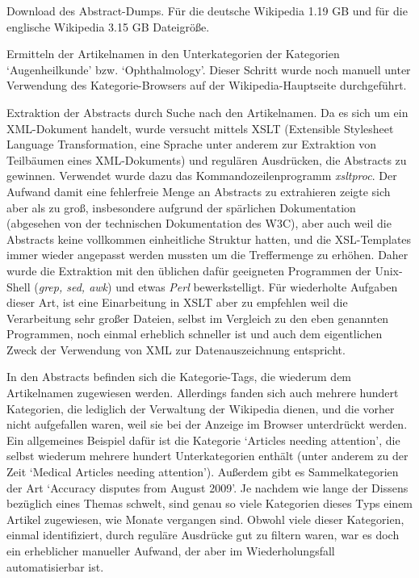 \documentclass[pagesize,DIV=calc,12pt,draft]{scrreprt}
\begin{document}
\begin{inparaenum}
\item Download des Abstract-Dumps. Für die deutsche Wikipedia 1.19 GB und für die englische Wikipedia 3.15 GB Dateigröße.

\item Ermitteln der Artikelnamen in den Unterkategorien der Kategorien   `Augenheilkunde' bzw. `Ophthalmology'. 
Dieser Schritt wurde noch   manuell unter Verwendung des Kategorie-Browsers auf der   Wikipedia-Hauptseite durchgeführt. 

\item Extraktion der Abstracts durch Suche nach den Artikelnamen. 
Da es sich um ein XML-Dokument handelt, wurde versucht mittels XSLT (Extensible   Stylesheet Language Transformation, eine Sprache unter anderem zur Extraktion von Teilbäumen eines XML-Dokuments) und regulären Ausdrücken, die   Abstracts zu gewinnen. 
Verwendet wurde dazu das Kommandozeilenprogramm   \emph{xsltproc}. 
Der Aufwand damit eine fehlerfreie Menge an Abstracts zu   extrahieren zeigte sich aber als zu groß, insbesondere aufgrund der   spärlichen Dokumentation (abgesehen von der technischen Dokumentation   des W3C), aber auch weil die Abstracts keine vollkommen einheitliche   Struktur hatten, und die XSL-Templates immer wieder angepasst werden   mussten um die Treffermenge zu erhöhen. 
Daher wurde die Extraktion mit   den üblichen dafür geeigneten Programmen der Unix-Shell (\emph{grep, sed,   awk}) und etwas \emph{Perl} bewerkstelligt. 
Für wiederholte Aufgaben dieser   Art, ist eine Einarbeitung in XSLT aber zu empfehlen weil die   Verarbeitung sehr großer Dateien, selbst im Vergleich zu den eben   genannten Programmen, noch einmal erheblich schneller ist und auch dem   eigentlichen Zweck der Verwendung von XML zur Datenauszeichnung   entspricht. 

\item In den Abstracts befinden sich die Kategorie-Tags, die wiederum dem   Artikelnamen zugewiesen werden. 
Allerdings fanden sich auch mehrere   hundert Kategorien, die lediglich der Verwaltung der Wikipedia dienen,   und die vorher nicht aufgefallen waren, weil sie bei der Anzeige im   Browser unterdrückt werden. 
Ein allgemeines Beispiel dafür ist die   Kategorie `Articles needing attention', die selbst wiederum mehrere   hundert Unterkategorien enthält (unter anderem zu der Zeit `Medical   Articles needing attention'). 
Außerdem gibt es Sammelkategorien der   Art `Accuracy disputes from August 2009'. 
Je nachdem wie lange der   Dissens bezüglich eines Themas schwelt, sind genau so viele Kategorien   dieses Typs einem Artikel zugewiesen, wie Monate vergangen sind. 
Obwohl viele dieser Kategorien, einmal identifiziert, durch reguläre   Ausdrücke gut zu filtern waren, war es doch ein erheblicher manueller   Aufwand, der aber im Wiederholungsfall automatisierbar ist. \end{inparaenum}
\end{document}
